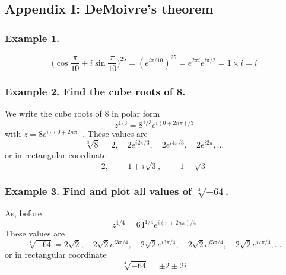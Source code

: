 \documentclass[../../../main.tex]{subfiles}
\begin{document}
\subsection{Appendix I: DeMoivre's theorem}
\subsubsection{Example 1.} 
\begin{equation*}
    \biggl(\cos\frac{\pi}{10} + i \sin\frac{\pi}{10}\biggr)^{25} = (e^{i\pi/10})^{25} = e^{2\pi i}e^{i\pi/2} = 1 \times i = i
\end{equation*}

\subsubsection{Example 2. Find the cube roots of 8.} We write the cube roots of 8 in polar form
\begin{equation*}
    z^{1/3}=8^{1/3}e^{i(0+2n\pi)/3}
\end{equation*}
with $z=8e^{i\cdot (0+2n\pi )}$. These values are
\begin{equation*}
    \sqrt[3]{8}=2,\quad  2e^{i2\pi/3},\quad2e^{i4\pi/3}, \quad 2e^{i2\pi}, \dots
\end{equation*}
or in rectangular coordinate
\begin{equation*}
    2, \quad-1+i\sqrt{3},\quad -1-\sqrt{3}
\end{equation*}

\subsubsection{Example 3. Find and plot all values of $\sqrt[4]{-64}$.} As, before
\begin{equation*}
    z^{1/4}=64^{1/4}e^{i(\pi+2n\pi)/4}
\end{equation*}
These values are
\begin{equation*}
    \sqrt[4]{-64}=2\sqrt{2},\quad  2\sqrt{2}e^{i3\pi/4},\quad 2\sqrt{2}e^{i3\pi/4}, \quad 2\sqrt{2}e^{i5\pi/4}, \quad2\sqrt{2}e^{i7\pi/4},\dots
\end{equation*}
or in rectangular coordinate
\begin{equation*}
    \sqrt[4]{-64}=\pm 2\pm 2i
\end{equation*}
\end{document}
